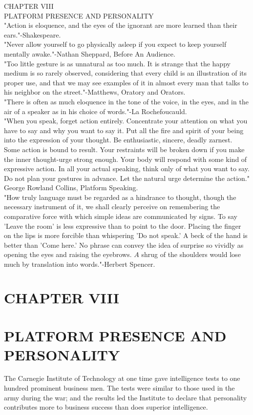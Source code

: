\documentclass[10pt]{article}
\begin{document}
CHAPTER VIII\\
PLATFORM PRESENCE AND PERSONALITY\\
"Action is eloquence, and the eyes of the ignorant are more learned than their ears."-Shakespeare.\\
"Never allow yourself to go physically asleep if you expect to keep yourself mentally awake."-Nathan Sheppard, Before An Audience.\\
"Too little gesture is as unnatural as too much. It is strange that the happy medium is so rarely observed, considering that every child is an illustration of its proper use, and that we may see examples of it in almost every man that talks to his neighbor on the street."-Matthews, Oratory and Orators.\\
"There is often as much eloquence in the tone of the voice, in the eyes, and in the air of a speaker as in his choice of words."-La Rochefoucauld.\\
"When you speak, forget action entirely. Concentrate your attention on what you have to say and why you want to say it. Put all the fire and spirit of your being into the expression of your thought. Be enthusiastic, sincere, deadly zarnest. Some action is bound to result. Your restraints will be broken down if you make the inner thought-urge strong enough. Your body will respond with some kind of expressive action. In all your actual speaking, think only of what you want to say. Do not plan your gestures in advance. Let the natural urge determine the action." George Rowland Collins, Platform Speaking.\\
"How truly language must be regarded as a hindrance to thought, though the necessary instrument of it, we shall clearly perceive on remembering the comparative force with which simple ideas are communicated by signs. To say 'Leave the room' is less expressive than to point to the door. Placing the finger on the lips is more forcible than whispering 'Do not speak.' A beck of the hand is better than 'Come here.' No phrase can convey the idea of surprise so vividly as opening the eyes and raising the eyebrows. $A$ shrug of the shoulders would lose much by translation into words."-Herbert Spencer.

\section*{CHAPTER VIII}
\section*{PLATFORM PRESENCE AND PERSONALITY}
The Carnegie Institute of Technology at one time gave intelligence tests to one hundred prominent business men. The tests were similar to those used in the army during the war; and the results led the Institute to declare that personality contributes more to business success than does superior intelligence.
\end{document}
